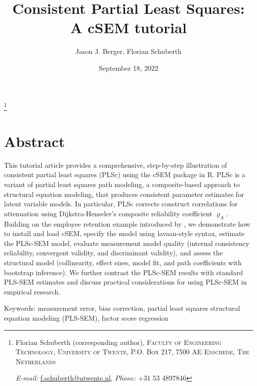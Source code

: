 \documentclass[12pt,a4paper]{article}\usepackage[]{graphicx}\usepackage[]{xcolor}
\newcommand\blfootnote[1]{%
  \begingroup
  \renewcommand\thefootnote{}\footnote{#1}%
  \addtocounter{footnote}{-1}%
  \endgroup
}
\newcommand{\pkg}[1]{\textsf{#1}}
\begin{document}


\title{Consistent Partial Least Squares: A cSEM tutorial}
\author{Jason J. Berger, Florian Schuberth}

\date{September 18, 2022}

\newcommand{\Addresses}{{%
  \bigskip
  \footnotesize

  Florian Schuberth (corresponding author), \textsc{Faculty of Engineering Technology, University of Twente, P.O. Box 217, 7500 AE Enschede,
The Netherlands}\par\nopagebreak
  \textit{E-mail:} \href{mailto:f.schuberth@utwente.nl}{f.schuberth@utwente.nl},
	\textit{Phone:} +31 53 4897846
}}

\maketitle

\blfootnote{\Addresses}

\newpage

\section*{Abstract}
This tutorial article provides a comprehensive, step-by-step illustration
of consistent partial least squares (PLSc) using the \pkg{cSEM} package in \textsf{R}.
PLSc is a variant of partial least squares path modeling, a composite-based approach to structural equation modeling, that produces consistent parameter estimates for latent variable models.
In particular, PLSc corrects construct correlations for
attenuation using Dijkstra-Henseler's composite reliability coefficient $\varrho_A$.
Building on the employee retention example
introduced by \citet{Cheah2026}, we demonstrate how to install and load
\pkg{cSEM}, specify the model using \pkg{lavaan}-style syntax, estimate the
PLSc-SEM model, evaluate measurement model quality (internal consistency
reliability, convergent validity, and discriminant validity), and assess the
structural model (collinearity, effect sizes, model fit, and path
coefficients with bootstrap inference). We further contrast the PLSc-SEM
results with standard PLS-SEM estimates and discuss practical
considerations for using PLSc-SEM in empirical research.


Keywords: measurement error, bias correction, partial least squares structural equation modeling (PLS-SEM), factor score regression
\end{document}
